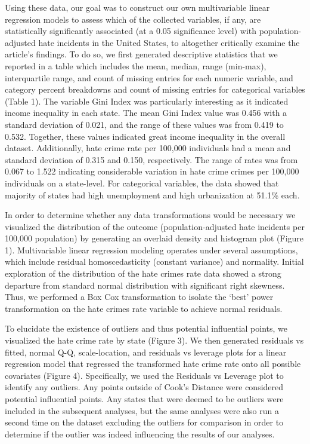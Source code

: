 \documentclass[
]{article}
\begin{document}
Using these data, our goal was to construct our own multivariable linear
regression models to assess which of the collected variables, if any,
are statistically significantly associated (at a 0.05 significance
level) with population-adjusted hate incidents in the United States, to
altogether critically examine the article's findings. To do so, we first
generated descriptive statistics that we reported in a table which
includes the mean, median, range (min-max), interquartile range, and
count of missing entries for each numeric variable, and category percent
breakdowns and count of missing entries for categorical variables (Table
1). The variable Gini Index was particularly interesting as it indicated
income inequality in each state. The mean Gini Index value was 0.456
with a standard deviation of 0.021, and the range of these values was
from 0.419 to 0.532. Together, these values indicated great income
inequality in the overall dataset. Additionally, hate crime rate per
100,000 individuals had a mean and standard deviation of 0.315 and
0.150, respectively. The range of rates was from 0.067 to 1.522
indicating considerable variation in hate crime crimes per 100,000
individuals on a state-level. For categorical variables, the data showed
that majority of states had high unemployment and high urbanization at
51.1\% each.

In order to determine whether any data transformations would be
necessary we visualized the distribution of the outcome
(population-adjusted hate incidents per 100,000 population) by
generating an overlaid density and histogram plot (Figure 1).
Multivariable linear regression modeling operates under several
assumptions, which include residual homoscedasticity (constant variance)
and normality. Initial exploration of the distribution of the hate
crimes rate data showed a strong departure from standard normal
distribution with significant right skewness. Thus, we performed a Box
Cox transformation to isolate the `best' power transformation on the
hate crimes rate variable to achieve normal residuals.

To elucidate the existence of outliers and thus potential influential
points, we visualized the hate crime rate by state (Figure 3). We then
generated residuals vs fitted, normal Q-Q, scale-location, and residuals
vs leverage plots for a linear regression model that regressed the
transformed hate crime rate onto all possible covariates (Figure 4).
Specifically, we used the Residuals vs Leverage plot to identify any
outliers. Any points outside of Cook's Distance were considered
potential influential points. Any states that were deemed to be outliers
were included in the subsequent analyses, but the same analyses were
also run a second time on the dataset excluding the outliers for
comparison in order to determine if the outlier was indeed influencing
the results of our analyses.
\end{document}
